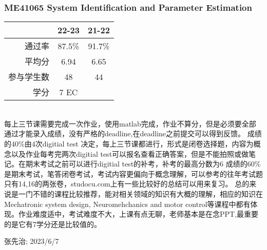 \subsubsection{ME41065 System Identification and Parameter Estimation}
\begin{minipage}{0.45\textwidth}
\centering
{}
\end{minipage}%
\begin{minipage}{0.45\textwidth}
\raggedleft
\begin{tabular}{r|c|c}
\textbf{ } & \textbf{22-23} & \textbf{21-22}\\ \hline
通过率 & 87.5\% & 91.7\% \\ 
平均分 & 6.94 & 6.65\\ 
参与学生数 & 48 &44\\
学分 & 7 EC&\\
\end{tabular}
\end{minipage}\\

每上三节课需要完成一次作业，使用matlab完成，作业不算分，但是必须要全部通过才能录入成绩，没有严格的deadline,在deadline之前提交可以得到反馈。
成绩的40\%由4次digitial test 决定，每上三节课都进行，形式是闭卷选择题，内容为概念以及作业每考完两次digitial test可以报名查看正确答案，但是不能拍照或做笔记。在期末考试之前可以进行digitial test的补考，补考的最高分数为6
成绩的60\%是期末考试，笔答闭卷考试，考试内容更偏向于概念理解，可以参考的往年考试题只有14,16的两张卷，studocu.com上有一些比较好的总结可以用来复习。
总的来说是一门不错的课程比较推荐，能对相关领域的知识有大概的理解，相应的知识在Mechatronic system design, Neuromehchanics and motor control等课程中都有体现。作业难度适中，考试难度不大，上课有点无聊，老师基本是在念PPT,最重要的是它有7学分还是比较值的。
\begin{flushright}
张先治; 2023/6/7
\end{flushright}

